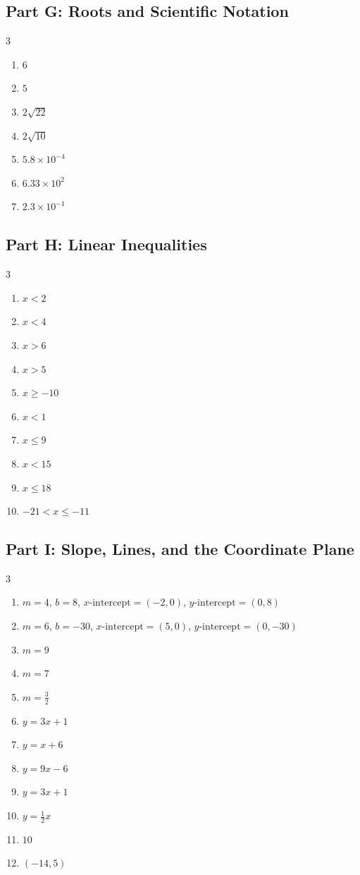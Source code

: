 \documentclass[11pt]{article}
\begin{document}
\subsection*{Part G: Roots and Scientific Notation}
\begin{multicols}{3}
\begin{enumerate}
  \item $6$
  \item $5$
  \item $2 \sqrt{22}$
  \item $2 \sqrt{10}$
  \item $5.8 \times 10^{-4}$
  \item $6.33 \times 10^{2}$
  \item $2.3 \times 10^{-1}$
\end{enumerate}
\end{multicols}
\subsection*{Part H: Linear Inequalities}
\begin{multicols}{3}
\begin{enumerate}
  \item $x < 2$
  \item $x < 4$
  \item $x > 6$
  \item $x > 5$
  \item $x \ge -10$
  \item $x < 1$
  \item $x \le 9$
  \item $x < 15$
  \item $x \le 18$
  \item $-21 < x \le -11$
\end{enumerate}
\end{multicols}
\subsection*{Part I: Slope, Lines, and the Coordinate Plane}
\begin{multicols}{3}
\begin{enumerate}
  \item $m = 4$, \quad $b = 8$, \quad $x\text{-intercept} = (-2, 0)$, \quad $y\text{-intercept} = (0, 8)$
  \item $m = 6$, \quad $b = -30$, \quad $x\text{-intercept} = (5, 0)$, \quad $y\text{-intercept} = (0, -30)$
  \item $m = 9$
  \item $m = 7$
  \item $m = \frac{3}{2}$
  \item $y = 3x + 1$
  \item $y = x + 6$
  \item $y = 9x - 6$
  \item $y = 3x + 1$
  \item $y = \frac{1}{2}x$
  \item $10$
  \item $(-14, 5)$
\end{enumerate}
\end{multicols}
\end{document}
